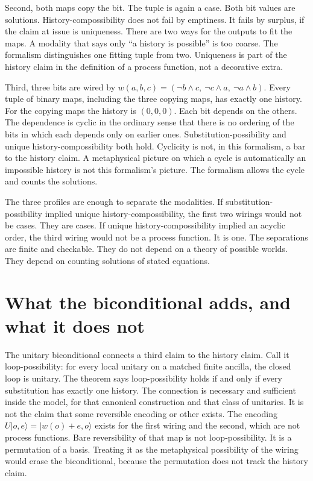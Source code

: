 \documentclass[11pt]{article}
\begin{document}
Second, both maps copy the bit. The tuple is again a case. Both bit values are solutions. History-compossibility does not fail by emptiness. It fails by surplus, if the claim at issue is uniqueness. There are two ways for the outputs to fit the maps. A modality that says only ``a history is possible'' is too coarse. The formalism distinguishes one fitting tuple from two. Uniqueness is part of the history claim in the definition of a process function, not a decorative extra.

Third, three bits are wired by \(w(a,b,c)=(\lnot b\land c,\ \lnot c\land a,\ \lnot a\land b)\). Every tuple of binary maps, including the three copying maps, has exactly one history. For the copying maps the history is \((0,0,0)\). Each bit depends on the others. The dependence is cyclic in the ordinary sense that there is no ordering of the bits in which each depends only on earlier ones. Substitution-possibility and unique history-compossibility both hold. Cyclicity is not, in this formalism, a bar to the history claim. A metaphysical picture on which a cycle is automatically an impossible history is not this formalism's picture. The formalism allows the cycle and counts the solutions.

The three profiles are enough to separate the modalities. If substitution-possibility implied unique history-compossibility, the first two wirings would not be cases. They are cases. If unique history-compossibility implied an acyclic order, the third wiring would not be a process function. It is one. The separations are finite and checkable. They do not depend on a theory of possible worlds. They depend on counting solutions of stated equations.

\section{What the biconditional adds, and what it does not}
\label{sec:iff}

The unitary biconditional connects a third claim to the history claim. Call it loop-possibility: for every local unitary on a matched finite ancilla, the closed loop is unitary. The theorem says loop-possibility holds if and only if every substitution has exactly one history. The connection is necessary and sufficient inside the model, for that canonical construction and that class of unitaries. It is not the claim that some reversible encoding or other exists. The encoding \(U\lvert o,e\rangle=\lvert w(o)+e,o\rangle\) exists for the first wiring and the second, which are not process functions. Bare reversibility of that map is not loop-possibility. It is a permutation of a basis. Treating it as the metaphysical possibility of the wiring would erase the biconditional, because the permutation does not track the history claim.
\end{document}
